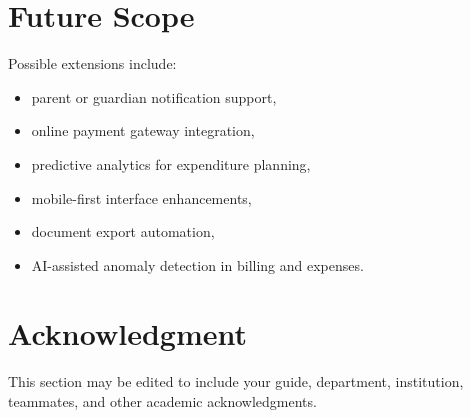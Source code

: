 \documentclass[conference]{IEEEtran}
\begin{document}
\section{Future Scope}
Possible extensions include:
\begin{itemize}
\item parent or guardian notification support,
\item online payment gateway integration,
\item predictive analytics for expenditure planning,
\item mobile-first interface enhancements,
\item document export automation,
\item AI-assisted anomaly detection in billing and expenses.
\end{itemize}

\section*{Acknowledgment}
This section may be edited to include your guide, department, institution, teammates, and other academic acknowledgments.
\end{document}
